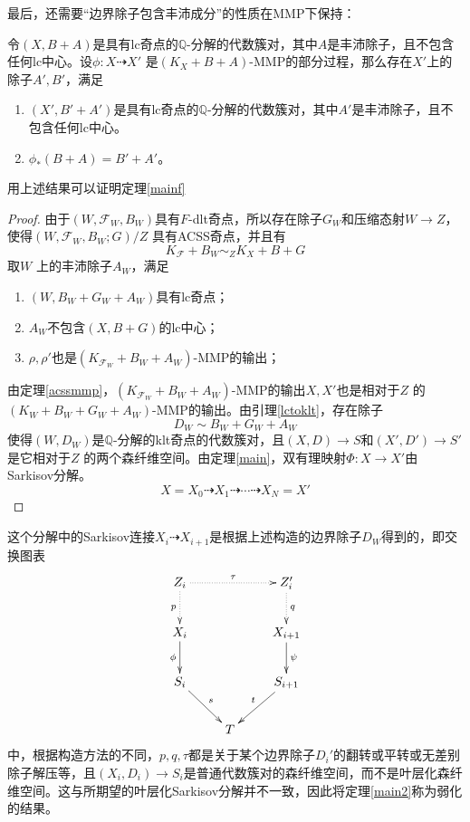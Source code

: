 最后，还需要``边界除子包含丰沛成分''的性质在MMP下保持：
\begin{lemma}\cite[Lemma 4.3]{tx23}
 令$(X,B+A)$是具有lc奇点的$\mathbb{Q}$-分解的代数簇对，其中$A$是丰沛除子，且不包含任何lc中心。设$\phi:X \dashrightarrow X' $ 是$(K_{X}+B+A)$-MMP的部分过程，那么存在$X'$上的除子$A',B'$，满足
 \begin{enumerate}
   \item $(X',B'+A')$是具有lc奇点的$\mathbb{Q}$-分解的代数簇对，其中$A'$是丰沛除子，且不包含任何lc中心。
   \item $\phi_{*}(B+A)=B'+A'$。
 \end{enumerate}
\end{lemma}
用上述结果可以证明定理\ref{mainf}
\begin{proof}
  由于$(W,\mathcal{F}_{W},B_{W})$具有$F$-dlt奇点，所以存在除子$G_{W}$和压缩态射$W\to Z$，使得$(W,\mathcal{F}_{W},B_{W};G)/Z$ 具有ACSS奇点，并且有
  \[ K_{\mathcal{F}}+B_{W} \sim_{Z} K_{X}+B+G \]
 取$W$ 上的丰沛除子$A_{W}$，满足
 \begin{enumerate}
   \item $(W,B_{W}+G_{W}+A_{W}) $具有lc奇点；
   \item $A_{W}$不包含$(X,B+G)$的lc中心；
   \item $\rho,\rho' $也是$(K_{\mathcal{F}_{W}}+B_{W}+A_{W})$-MMP的输出；
 \end{enumerate}
 由定理\ref{acssmmp}，$(K_{\mathcal{F}_{W}}+B_{W}+A_{W})$-MMP的输出$X,X'$也是相对于$Z$ 的$(K_{W}+B_{W}+G_{W}+A_{W})$-MMP的输出。由引理\ref{lctoklt}，存在除子
\[ D_{W}\sim B_{W}+G_{W}+A_{W} \]
使得$(W,D_{W})$是$\mathbb{Q}$-分解的klt奇点的代数簇对，且$(X,D)\to S $和$(X',D')\to S' $是它相对于$Z$ 的两个森纤维空间。由定理\ref{main}，双有理映射$\Phi:X\to X'$由Sarkisov分解。 
\[ X=X_{0}\dashrightarrow X_{1}\dashrightarrow \cdots \dashrightarrow X_{N}=X' \]
\end{proof}

\begin{remark}
 这个分解中的Sarkisov连接$X_{i}\dashrightarrow X_{i+1}$是根据上述构造的边界除子$D_{W}$得到的，即交换图表
  \[ \xymatrix{
      Z_{i}\ar@{.>}[d]_p\ar@{.>}[rr]^{\tau}&&Z_{i}'\ar@{.>}[d]^q\\
      X_{i}\ar[d]_{\phi}&&X_{i+1}\ar[d]^\psi\\
      S_{i}\ar[rd]^s&&S_{i+1}\ar[ld]_t\\
      &T&} \]
      中，根据构造方法的不同，$p,q,\tau$都是关于某个边界除子$D_{i}'$的翻转或平转或无差别除子解压等，且$(X_{i},D_{i})\to S_{i}$是普通代数簇对的森纤维空间，而不是叶层化森纤维空间。这与所期望的叶层化Sarkisov分解并不一致，因此将定理\ref{main2}称为弱化的结果。

\end{remark}

